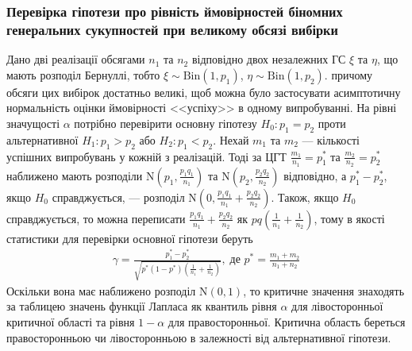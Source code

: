 \subsubsection*{Перевірка гіпотези про рівність ймовірностей біномних генеральних 
сукупностей при великому обсязі вибірки}
Дано дві реалізації обсягами $n_1$ та $n_2$ відповідно двох незалежних ГС $\xi$ та $\eta$, що мають розподіл Бернуллі, тобто
$\xi \sim \mathrm{Bin}(1, p_1)$, $\eta \sim \mathrm{Bin}(1, p_2)$.
причому обсяги цих вибірок достатньо великі, щоб можна було застосувати асимптотичну
нормальність оцінки ймовірності <<успіху>> в одному випробуванні. На рівні значущості
$\alpha$ потрібно перевірити основну гіпотезу $H_0: p_1 = p_2$ проти альтернативної
$H_1: p_1 > p_2$ або $H_2: p_1 < p_2$. Нехай $m_1$ та $m_2$ --- кількості успішних випробувань
у кожній з реалізацій. Тоді за ЦГТ
$\frac{m_1}{n_1} = p_1^*$ та $\frac{m_2}{n_2} = p_2^*$ наближено мають розподіли
$\mathrm{N}\left(p_1, \frac{p_1 q_1}{n_1}\right)$ та $\mathrm{N}\left(p_2, \frac{p_2 q_2}{n_2}\right)$ відповідно,
а $p_1^* - p_2^*$, якщо $H_0$ справджується, --- розподіл $\mathrm{N}\left(0, \frac{p_1 q_1}{n_1} + \frac{p_2 q_2}{n_2}\right)$.
Також, якщо $H_0$ справджується, то можна переписати $\frac{p_1 q_1}{n_1} + \frac{p_2 q_2}{n_2}$
як $p q \left(\frac{1}{n_1} + \frac{1}{n_2}\right)$, тому в якості статистики для перевірки основної гіпотези беруть
\begin{gather*}
    \gamma = \frac{p_1^* - p_2^*}{\sqrt{p^* (1 - p^*) \left(\frac{1}{n_1} + \frac{1}{n_2}\right)}},
    \; \text{де } p^* = \frac{m_1 + m_2}{n_1 + n_2}
\end{gather*}
Оскільки вона має наближено розподіл $\mathrm{N}(0, 1)$, то критичне значення знаходять
за таблицею значень функції Лапласа як квантиль рівня $\alpha$ для лівосторонньої критичної області
та рівня $1-\alpha$ для правосторонньої. Критична область береться правосторонньою чи лівосторонньою
в залежності від альтернативної гіпотези.

